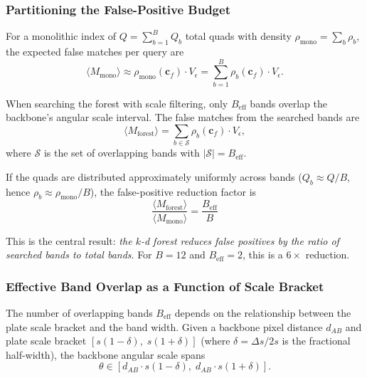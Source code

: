 \documentclass[twocolumn, 10pt]{article}
\begin{document}
\subsubsection{Partitioning the False-Positive Budget}

For a monolithic index of $Q = \sum_{b=1}^B Q_b$ total quads with
density $\rho_{\text{mono}} = \sum_b \rho_b$, the expected false
matches per query are
\begin{equation} \label{eq:Mmono}
    \langle M_{\text{mono}} \rangle
    \approx \rho_{\text{mono}}(\mathbf{c}_f) \cdot V_\epsilon
    = \sum_{b=1}^B \rho_b(\mathbf{c}_f) \cdot V_\epsilon.
\end{equation}

When searching the forest with scale filtering, only $B_{\text{eff}}$
bands overlap the backbone's angular scale interval. The false matches
from the searched bands are
\begin{equation} \label{eq:Mforest}
    \langle M_{\text{forest}} \rangle
    = \sum_{b \in \mathcal{S}} \rho_b(\mathbf{c}_f) \cdot V_\epsilon,
\end{equation}
where $\mathcal{S}$ is the set of overlapping bands with
$|\mathcal{S}| = B_{\text{eff}}$.

If the quads are distributed approximately uniformly across bands
($Q_b \approx Q/B$, hence $\rho_b \approx \rho_{\text{mono}} / B$),
the false-positive reduction factor is
\begin{equation} \label{eq:reduction}
    \boxed{
    \frac{\langle M_{\text{forest}} \rangle}
         {\langle M_{\text{mono}} \rangle}
    = \frac{B_{\text{eff}}}{B}
    }
\end{equation}

This is the central result: \emph{the $k$-d forest reduces false
positives by the ratio of searched bands to total bands}. For
$B = 12$ and $B_{\text{eff}} = 2$, this is a $6\times$ reduction.

\subsubsection{Effective Band Overlap as a Function of Scale Bracket}
\label{sec:beff}

The number of overlapping bands $B_{\text{eff}}$ depends on the
relationship between the plate scale bracket and the band width. Given
a backbone pixel distance $d_{AB}$ and plate scale bracket
$[s(1 - \delta),\; s(1 + \delta)]$ (where $\delta = \Delta s / 2s$
is the fractional half-width), the backbone angular scale spans
\begin{equation}
    \theta \in \left[ d_{AB} \cdot s(1 - \delta),\;
    d_{AB} \cdot s(1 + \delta) \right].
\end{equation}
\end{document}
